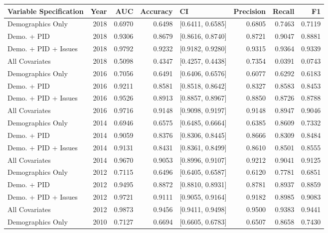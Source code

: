 \begin{table}[H]
\centering
\begin{tabular}{lrrrlrrr}
  \toprule
Variable Specification & Year & AUC & Accuracy & CI & Precision & Recall & F1 \\ 
  \midrule
Demographics Only & 2018 & 0.6970 & 0.6498 & [0.6411, 0.6585] & 0.6805 & 0.7463 & 0.7119 \\ 
  Demo. + PID & 2018 & 0.9306 & 0.8679 & [0.8616, 0.8740] & 0.8721 & 0.9047 & 0.8881 \\ 
  Demo. + PID + Issues & 2018 & 0.9792 & 0.9232 & [0.9182, 0.9280] & 0.9315 & 0.9364 & 0.9339 \\ 
  All Covariates & 2018 & 0.5098 & 0.4347 & [0.4257, 0.4438] & 0.7354 & 0.0391 & 0.0743 \\ 
  Demographics Only & 2016 & 0.7056 & 0.6491 & [0.6406, 0.6576] & 0.6077 & 0.6292 & 0.6183 \\ 
  Demo. + PID & 2016 & 0.9211 & 0.8581 & [0.8518, 0.8642] & 0.8327 & 0.8583 & 0.8453 \\ 
  Demo. + PID + Issues & 2016 & 0.9526 & 0.8913 & [0.8857, 0.8967] & 0.8850 & 0.8726 & 0.8788 \\ 
  All Covariates & 2016 & 0.9716 & 0.9148 & [0.9098, 0.9197] & 0.9148 & 0.8947 & 0.9046 \\ 
  Demographics Only & 2014 & 0.6946 & 0.6575 & [0.6485, 0.6664] & 0.6385 & 0.8609 & 0.7332 \\ 
  Demo. + PID & 2014 & 0.9059 & 0.8376 & [0.8306, 0.8445] & 0.8666 & 0.8309 & 0.8484 \\ 
  Demo. + PID + Issues & 2014 & 0.9131 & 0.8431 & [0.8361, 0.8499] & 0.8610 & 0.8501 & 0.8555 \\ 
  All Covariates & 2014 & 0.9670 & 0.9053 & [0.8996, 0.9107] & 0.9212 & 0.9041 & 0.9125 \\ 
  Demographics Only & 2012 & 0.7115 & 0.6496 & [0.6405, 0.6587] & 0.6120 & 0.7781 & 0.6851 \\ 
  Demo. + PID & 2012 & 0.9495 & 0.8872 & [0.8810, 0.8931] & 0.8781 & 0.8937 & 0.8859 \\ 
  Demo. + PID + Issues & 2012 & 0.9721 & 0.9111 & [0.9055, 0.9164] & 0.9182 & 0.8985 & 0.9083 \\ 
  All Covariates & 2012 & 0.9873 & 0.9456 & [0.9411, 0.9498] & 0.9500 & 0.9383 & 0.9441 \\ 
  Demographics Only & 2010 & 0.7127 & 0.6694 & [0.6605, 0.6783] & 0.6507 & 0.8658 & 0.7430 \\ 

\end{tabular}
\end{table}
